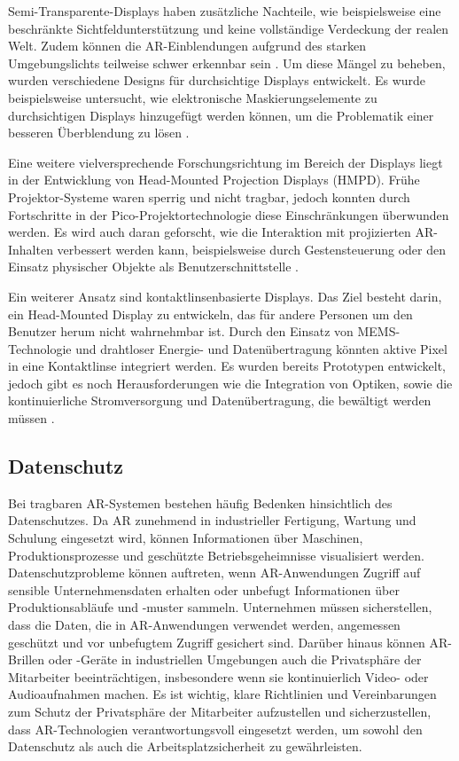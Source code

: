 Semi-Transparente-Displays haben zusätzliche Nachteile, wie beispielsweise eine
beschränkte Sichtfeldunterstützung und keine vollständige Verdeckung der realen
Welt. Zudem können die AR-Einblendungen aufgrund des starken Umgebungslichts
teilweise schwer erkennbar sein \cite{itoh2021towards}. Um diese Mängel zu
beheben, wurden verschiedene Designs für durchsichtige Displays entwickelt. Es
wurde beispielsweise untersucht, wie elektronische Maskierungselemente zu
durchsichtigen Displays hinzugefügt werden können, um die Problematik einer
besseren Überblendung zu lösen \cite{8676153}.

Eine weitere vielversprechende Forschungsrichtung im Bereich der Displays liegt
in der Entwicklung von Head-Mounted Projection Displays (HMPD). Frühe
Projektor-Systeme waren sperrig und nicht tragbar, jedoch konnten durch
Fortschritte in der Pico-Projektortechnologie diese Einschränkungen überwunden
werden. Es wird auch daran geforscht, wie die Interaktion mit projizierten
AR-Inhalten verbessert werden kann, beispielsweise durch Gestensteuerung oder
den Einsatz physischer Objekte als Benutzerschnittstelle
\cite{hartmann2020aar}.

Ein weiterer Ansatz sind kontaktlinsenbasierte Displays. Das Ziel besteht
darin, ein Head-Mounted Display zu entwickeln, das für andere Personen um den
Benutzer herum nicht wahrnehmbar ist. Durch den Einsatz von MEMS-Technologie
und drahtloser Energie- und Datenübertragung könnten aktive Pixel in eine
Kontaktlinse integriert werden. Es wurden bereits Prototypen entwickelt, jedoch
gibt es noch Herausforderungen wie die Integration von Optiken, sowie die
kontinuierliche Stromversorgung und Datenübertragung, die bewältigt werden
müssen \cite{chen2019design}.

\subsection{Datenschutz}

Bei tragbaren AR-Systemen bestehen häufig Bedenken hinsichtlich des
Datenschutzes. Da AR zunehmend in industrieller Fertigung, Wartung und Schulung
eingesetzt wird, können Informationen über Maschinen, Produktionsprozesse und
geschützte Betriebsgeheimnisse visualisiert werden. Datenschutzprobleme können
auftreten, wenn AR-Anwendungen Zugriff auf sensible Unternehmensdaten erhalten
oder unbefugt Informationen über Produktionsabläufe und -muster sammeln.
Unternehmen müssen sicherstellen, dass die Daten, die in AR-Anwendungen
verwendet werden, angemessen geschützt und vor unbefugtem Zugriff gesichert
sind. Darüber hinaus können AR-Brillen oder -Geräte in industriellen Umgebungen
auch die Privatsphäre der Mitarbeiter beeinträchtigen, insbesondere wenn sie
kontinuierlich Video- oder Audioaufnahmen machen. Es ist wichtig, klare
Richtlinien und Vereinbarungen zum Schutz der Privatsphäre der Mitarbeiter
aufzustellen und sicherzustellen, dass AR-Technologien verantwortungsvoll
eingesetzt werden, um sowohl den Datenschutz als auch die 
Arbeitsplatzsicherheit zu gewährleisten.\cite{de2018augmented,9613426}